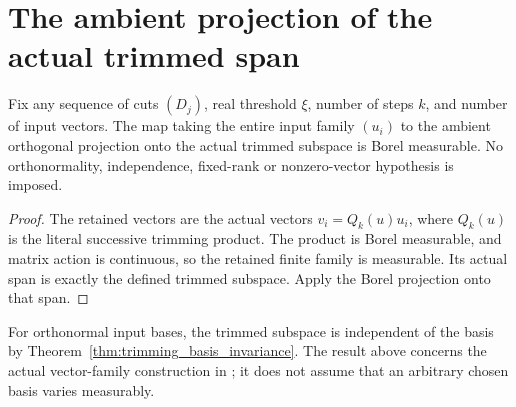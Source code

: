 \section{The ambient projection of the actual trimmed span}

\begin{theorem}
    \label{thm:borel_trim_subspace_projection}
    \leanok
    Fix any sequence of cuts $(D_j)$, real threshold $\xi$, number of
    steps $k$, and number of input vectors. The map taking the entire
    input family $(u_i)$ to the ambient orthogonal projection onto the
    actual trimmed subspace is Borel measurable. No orthonormality,
    independence, fixed-rank or nonzero-vector hypothesis is imposed.
\end{theorem}
\begin{proof}\leanok
    The retained vectors are the actual vectors $v_i=Q_k(u)u_i$, where
    $Q_k(u)$ is the literal successive trimming product. The product is
    Borel measurable, and matrix action is continuous, so the retained
    finite family is measurable. Its actual span is exactly the defined
    trimmed subspace. Apply the Borel projection onto that span.
\end{proof}

For orthonormal input bases, the trimmed subspace is independent of the
basis by Theorem~\ref{thm:trimming_basis_invariance}. The result above
concerns the actual vector-family construction in
\cite[collective-trimming definition, lines 648--655]{Arad2016RigorousRG};
it does not assume that an arbitrary chosen basis varies measurably.
